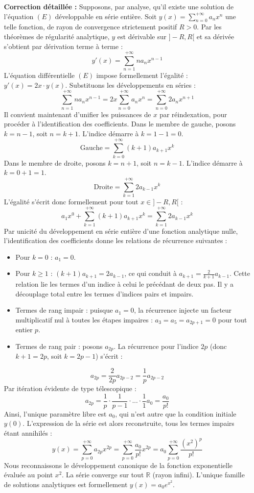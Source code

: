 \documentclass{report}
\begin{document}
\textbf{Correction détaillée :}
Supposons, par analyse, qu'il existe une solution de l'équation $(E)$ développable en série entière.
Soit $y(x) = \sum_{n=0}^{+\infty} a_n x^n$ une telle fonction, de rayon de convergence strictement positif $R > 0$.
Par les théorèmes de régularité analytique, $y$ est dérivable sur $]-R, R[$ et sa dérivée s'obtient par dérivation terme à terme :
$$ y'(x) = \sum_{n=1}^{+\infty} n a_n x^{n-1} $$
L'équation différentielle $(E)$ impose formellement l'égalité : $y'(x) = 2x \cdot y(x)$.
Substituons les développements en séries :
$$ \sum_{n=1}^{+\infty} n a_n x^{n-1} = 2x \sum_{n=0}^{+\infty} a_n x^n = \sum_{n=0}^{+\infty} 2 a_n x^{n+1} $$
Il convient maintenant d'unifier les puissances de $x$ par réindexation, pour procéder à l'identification des coefficients.
Dans le membre de gauche, posons $k = n-1$, soit $n = k+1$. L'indice démarre à $k = 1-1=0$.
$$ \text{Gauche} = \sum_{k=0}^{+\infty} (k+1) a_{k+1} x^k $$
Dans le membre de droite, posons $k = n+1$, soit $n = k-1$. L'indice démarre à $k = 0+1=1$.
$$ \text{Droite} = \sum_{k=1}^{+\infty} 2 a_{k-1} x^k $$
L'égalité s'écrit donc formellement pour tout $x \in ]-R, R[$ :
$$ a_1 x^0 + \sum_{k=1}^{+\infty} (k+1) a_{k+1} x^k = \sum_{k=1}^{+\infty} 2 a_{k-1} x^k $$
Par unicité du développement en série entière d'une fonction analytique nulle, l'identification des coefficients donne les relations de récurrence suivantes :
\begin{itemize}
\item Pour $k = 0$ : $a_1 = 0$.
\item Pour $k \geq 1$ : $(k+1)a_{k+1} = 2 a_{k-1}$, ce qui conduit à $a_{k+1} = \frac{2}{k+1} a_{k-1}$.
Cette relation lie les termes d'un indice à celui le précédant de deux pas. Il y a découplage total entre les termes d'indices pairs et impairs.
\item Termes de rang impair : puisque $a_1 = 0$, la récurrence injecte un facteur multiplicatif nul à toutes les étapes impaires : $a_3 = a_5 = a_{2p+1} = 0$ pour tout entier $p$.
\item Termes de rang pair : posons $a_{2p}$. La récurrence pour l'indice $2p$ (donc $k+1=2p$, soit $k=2p-1$) s'écrit :
\end{itemize}
$$ a_{2p} = \frac{2}{2p} a_{2p-2} = \frac{1}{p} a_{2p-2} $$
Par itération évidente de type télescopique :
$$ a_{2p} = \frac{1}{p} \cdot \frac{1}{p-1} \cdot ... \cdot \frac{1}{1} a_0 = \frac{a_0}{p!} $$
Ainsi, l'unique paramètre libre est $a_0$, qui n'est autre que la condition initiale $y(0)$.
L'expression de la série est alors reconstruite, tous les termes impairs étant annihilés :
$$ y(x) = \sum_{p=0}^{+\infty} a_{2p} x^{2p} = \sum_{p=0}^{+\infty} \frac{a_0}{p!} x^{2p} = a_0 \sum_{p=0}^{+\infty} \frac{(x^2)^p}{p!} $$
Nous reconnaissons le développement canonique de la fonction exponentielle évaluée au point $x^2$.
La série converge sur tout $\mathbb{R}$ (rayon infini).
L'unique famille de solutions analytiques est formellement $y(x) = a_0 e^{x^2}$.
\end{document}
